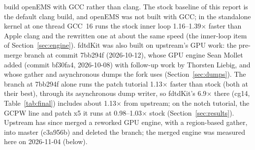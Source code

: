 build openEMS with GCC rather than clang. The stock baseline of this report is the default clang build, and openEMS
was not built with GCC; in the standalone kernel at one thread GCC~16 runs the stock inner loop 1.16--1.39$\times$
faster than Apple clang and the rewritten one at about the same speed (the inner-loop item of
Section~\ref{sec:engine}). fdtdKit was also built on upstream's GPU work: the pre-merge  branch at
commit 7bb294f (2026-10-12), whose GPU engine Sean Mollet added (commit bf30fa4, 2026-10-08) with follow-up work by
Thorsten Liebig, and whose gather and asynchronous dumps the fork uses (Section~\ref{sec:dumps}). The branch at
7bb294f alone runs the patch tutorial 1.13$\times$ faster than stock (both at their best), through its asynchronous
dump writer, so fdtdKit's 6.9$\times$ there (cg14, Table~\ref{tab:final}) includes about 1.13$\times$ from upstream; on
the notch tutorial, the GCPW line and patch x5 it runs at 0.98--1.03$\times$ stock (Section~\ref{sec:results}).
Upstream has since merged a reworked GPU engine, with a region-based gather, into master (c3a956b) and deleted the
branch; the merged engine was measured here on 2026-11-04 (below).


